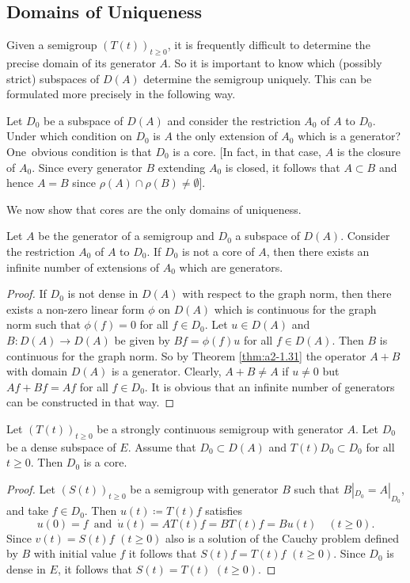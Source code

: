 \subsection{Domains of Uniqueness} \label{subsec:a2-1.se9}
Given a semigroup $(T(t))_{t \geq 0}$,  
it is frequently difficult to determine the precise domain of its generator $A$.
So it is important to know which (possibly strict) subspaces of $D(A)$ determine the semigroup uniquely.
This can be formulated more precisely in the following way.

Let $D_{0}$ be a subspace of $D(A)$ and consider the restriction $A_{0}$ of $A$ to $D_{0}$.
Under which condition on $D_{0}$ is $A$ the only extension of $A_{0}$ which is a generator?
One~obvious condition is that $D_{0}$ is a core.
[In fact, in that case, $A$ is the closure of $A_{0}$.
Since every generator $B$ extending $A_{0}$ is closed, it follows that $A \subset B$ and hence $A = B$ since 
$\rho(A) \cap \rho(B) \neq \emptyset$].

We now show that cores are the only domains of uniqueness.

\begin{theorem}\label{thm:a2-1.33}
Let $A$ be the generator of a semigroup and $D_{0}$ a subspace of $D(A)$.
Consider the restriction $A_{0}$ of $A$ to $D_{0}$.
If $D_{0}$ is not a core of $A$, then there exists an infinite number of extensions of $A_{0}$ which are generators.
\end{theorem}
\begin{proof}
If $D_{0}$ is not dense in $D(A)$ with respect to the graph norm, then there exists a non-zero linear form $\phi$ on $D(A)$ which is continuous for the graph norm such that $\phi(f) = 0$ for all $f \in D_{0}$. 
Let $u \in D(A)$ and $B \colon D(A) \to D(A)$ be given by $Bf = \phi(f)u$ for all $f \in D(A)$.
Then $B$ is continuous for the graph norm.
So by Theorem \ref{thm:a2-1.31}   the operator $A+B$ with domain $D(A)$ is a generator.
Clearly, $A+B \neq A$ if $u \neq 0$ but $Af+Bf = Af$ for all $f \in D_{0}$.
It is obvious that an infinite number of generators can be constructed in that way.
\end{proof}
\begin{corollary}\label{cor:a2-1.34}
Let $(T(t))_{t\geq 0}$ be a strongly continuous semigroup with generator $A$.
Let $D_{0}$ be a dense subspace of $E$.
Assume that $D_{0} \subset D(A)$ and $T(t)D_{0} \subset D_{0}$ for all $t \geq 0$.
Then $D_{0}$ is a core.
\end{corollary}
\begin{proof}
Let $(S(t))_{t\geq 0}$ be a semigroup with generator $B$ such that $B|_{D_{0}} = A|_{D_{0}}$, and take $f \in D_{0}$.
Then $u(t) \coloneqq T(t)f$ satisfies 
\[
u(0) = f\,  \text{ and } \,\dot{u}(t) = AT(t)f = BT(t)f = Bu(t) \quad (t \geq 0).
\]
Since $v(t) = S(t)f$ $(t \geq 0)$ also is a solution of the Cauchy problem defined by $B$ with initial value $f$ it follows that $S(t)f = T(t)f$ $(t\geq 0)$.
Since $D_{0}$ is dense in $E$, it follows that $S(t) = T(t)$ $(t \geq 0)$.
\end{proof}

